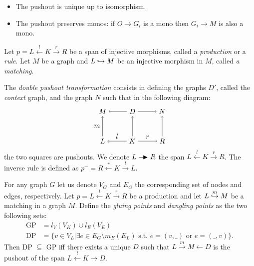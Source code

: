 \begin{property}
  \begin{itemize}
  \item The pushout is unique up to isomorphism.
  \item The pushout preserves monos: if $O\to G_i$ is a mono then $G_i\to M$ is also a mono.
  \end{itemize}
\end{property}

\begin{definition}
  Let $p = L\overset{l}{\leftarrow} K \overset{r}{\rightarrow} R$ be a span of injective morphisms, called a \emph{production} or a \emph{rule}. Let $M$ be a graph and $L\hookrightarrow M$ be an injective morphism in $M$, called \emph{a matching}.

  The \emph{double pushout transformation} consists in defining the graphs $D'$, called the \emph{context} graph, and the graph $N$ such that in the following diagram:
  \[
  \begin{tikzpicture} %
    \node (l) at (-1.5,0) {\(L\)};
    \node (d) at (0,0) {\(K\)};
    \node (r) at (1.5,0) {\(R\)};
    \node (m) at (-1.5,1.5) {\(M\)};
    \node (d') at (0,1.5) {\(D\)};
    \node (n) at (1.5,1.5) {\(N\)};
    \draw [->] (d) -- node [above,midway] {\(l\)} (l);
    \draw [->] (d) -- node [above,midway] {\(r\)} (r);
    \draw [->] (d') -- (m);
    \draw [->] (d') -- (n);
    \draw [->] (l) -- node [left,midway] {\(m\)}  (m);
    \draw [->] (d) -- (d');
    \draw [->] (r) -- (n);
  \end{tikzpicture}
  \]
  the two squares are pushouts.
  We denote $L\action R$ the span $L\overset{l}{\leftarrow} K \overset{r}{\rightarrow} R$. The inverse rule is defined as $p^{-} = R\overset{r}{\leftarrow} K \overset{l}{\rightarrow} L$.
\end{definition}

\begin{property}
  For any graph $G$ let us denote $V_G$ and $E_G$ the corresponding set of nodes and edges, respectively.
  Let $p = L\overset{l}{\leftarrow} K \overset{r}{\rightarrow} R$ be a production and let $L\overset{m}{\hookrightarrow} M$ be a matching in a graph $M$.
  Define the \emph{gluing points} and \emph{dangling points} as the two following sets:
  \begin{align*}
  \text{GP} &= l_V(V_K)\cup l_E(V_E)\\
  \text{DP} &= \{ v\in V_L \big| \exists e\in E_G\setminus m_E(E_L)\text{ s.t. }e=(v,\_)\text{ or }e=(\_, v)\}.
  \end{align*}
  Then DP $\subseteq$ GP iff there exists a unique $D$ such that $L\overset{m}{\rightarrow} M{\leftarrow} D$ is the pushout of the span $ L\overset{l}{\leftarrow} K {\rightarrow} D$.
\end{property}

